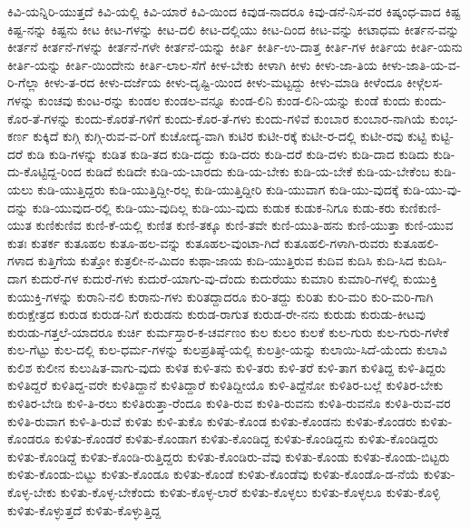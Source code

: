 {ಕಿವಿ-ಯನ್ನಿರಿ-ಯುತ್ತದೆ
ಕಿವಿ-ಯಲ್ಲಿ
ಕಿವಿ-ಯಾರೆ
ಕಿವಿ-ಯಿಂದ
ಕಿವುಡ-ನಾದರೂ
ಕಿವು-ಡನೆ-ನಿಸ-ವರ
ಕಿಷ್ಕಂಧ-ವಾದ
ಕಿಷ್ಟ
ಕಿಷ್ಟ-ನನ್ನು
ಕಿಷ್ಟನು
ಕೀಟ
ಕೀಟ-ಗಳನ್ನು
ಕೀಟ-ದಲಿ
ಕೀಟ-ದಲ್ಲಿಯು
ಕೀಟ-ದಿಂದ
ಕೀಟ-ವನ್ನು
ಕೀಟಾಧಮ
ಕೀರ್ತನ-ವನ್ನು
ಕೀರ್ತನೆ
ಕೀರ್ತನೆ-ಗಳನ್ನು
ಕೀರ್ತನೆ-ಗಳೇ
ಕೀರ್ತನೆ-ಯನ್ನು
ಕೀರ್ತಿ
ಕೀರ್ತಿ-ಉ-ದಾತ್ತ
ಕೀರ್ತಿ-ಗಳ
ಕೀರ್ತಿಯ
ಕೀರ್ತಿ-ಯನು
ಕೀರ್ತಿ-ಯನ್ನು
ಕೀರ್ತಿ-ಯಿಂದೇನು
ಕೀರ್ತಿ-ಲಾಲ-ಸೆಗೆ
ಕೀಳ-ಬೇಕು
ಕೀಳಾಗಿ
ಕೀಳು
ಕೀಳು-ಜಾ-ತಿಯ
ಕೀಳು-ಜಾತಿ-ಯ-ವ-ರಿ-ಗೆಲ್ಲಾ
ಕೀಳು-ತ-ರದ
ಕೀಳು-ದರ್ಜೆಯ
ಕೀಳು-ದೃಷ್ಟಿ-ಯಿಂದ
ಕೀಳು-ಮಟ್ಟದ್ದು
ಕೀಳು-ಮಾಡಿ
ಕೀಳೆಂದೂ
ಕೀಳ್ಗೆಲಸ-ಗಳನ್ನು
ಕುಂಚವು
ಕುಂಟ-ರನ್ನು
ಕುಂಡಲ
ಕುಂಡಲ-ವನ್ನೂ
ಕುಂಡ-ಲಿನಿ
ಕುಂಡ-ಲಿನಿ-ಯನ್ನು
ಕುಂಡೆ
ಕುಂದು
ಕುಂದು-ಕೊರ-ತೆ-ಗಳನ್ನು
ಕುಂದು-ಕೊರತೆ-ಗಳಿಗೆ
ಕುಂದು-ಕೊರ-ತೆ-ಗಳು
ಕುಂದು-ಗಳಿವೆ
ಕುಂಬಾರ
ಕುಂಬಾರ-ನಾಗಿಯೆ
ಕುಂಭ-ಕರ್ಣ
ಕುಕ್ಕಿದೆ
ಕುಗ್ಗಿ
ಕುಗ್ಗಿ-ರುವ-ವ-ರಿಗೆ
ಕುಚೋದ್ಯ-ವಾಗಿ
ಕುಟಿರ
ಕುಟೀ-ರಕ್ಕೆ
ಕುಟೀ-ರ-ದಲ್ಲಿ
ಕುಟೀ-ರವು
ಕುಟ್ಟಿ
ಕುಟ್ಟಿ-ದರೆ
ಕುಡಿ
ಕುಡಿ-ಗಳನ್ನು
ಕುಡಿತ
ಕುಡಿ-ತದ
ಕುಡಿ-ದದ್ದು
ಕುಡಿ-ದರು
ಕುಡಿ-ದರೆ
ಕುಡಿ-ದಳು
ಕುಡಿ-ದಾದ
ಕುಡಿದು
ಕುಡಿ-ದು-ಕೊಟ್ಟಿದ್ದ-ರಿಂದ
ಕುಡಿದೆ
ಕುಡಿದೇ
ಕುಡಿ-ಯ-ಬಾರದು
ಕುಡಿ-ಯ-ಬೇಕು
ಕುಡಿ-ಯ-ಬೇಕೆ
ಕುಡಿ-ಯ-ಬೇಕೆಂಬ
ಕುಡಿ-ಯಲು
ಕುಡಿ-ಯುತ್ತಿದ್ದರು
ಕುಡಿ-ಯುತ್ತಿದ್ದೀ-ರಲ್ಲ
ಕುಡಿ-ಯುತ್ತಿದ್ದೀರಿ
ಕುಡಿ-ಯುವಾಗ
ಕುಡಿ-ಯು-ವುದಕ್ಕೆ
ಕುಡಿ-ಯು-ವು-ದನ್ನು
ಕುಡಿ-ಯುವುದ-ರಲ್ಲಿ
ಕುಡಿ-ಯು-ವುದಿಲ್ಲ
ಕುಡಿ-ಯು-ವುದು
ಕುಡುಕ
ಕುಡುಕ-ನಿಗೂ
ಕುಡು-ಕರು
ಕುಣಿಕುಣಿ-ಯುತ
ಕುಣಿಕುಣಿವ
ಕುಣಿ-ಕೆ-ಯಲ್ಲಿ
ಕುಣಿತ
ಕುಣಿ-ತಕ್ಕೂ
ಕುಣಿ-ತವೇ
ಕುಣಿ-ಯುತಿ-ಹನು
ಕುಣಿ-ಯುತ್ತಾ
ಕುಣಿ-ಯುವ
ಕುತಃ
ಕುತರ್ಕ
ಕುತೂಹಲ
ಕುತೂ-ಹಲ-ವನ್ನು
ಕುತೂಹಲ-ವುಂಟಾ-ಗಿದೆ
ಕುತೂಹಲಿ-ಗಳಾಗಿ-ರುವರು
ಕುತೂಹಲಿ-ಗಳಾದ
ಕುತ್ತಿಗೆಯ
ಕುತ್ತೋ
ಕುತ್ರಲೀ-ನ-ಮಿದಂ
ಕುಥಾ-ಜಾಯ
ಕುದಿ-ಯುತ್ತಿರುವ
ಕುದಿವ
ಕುದಿಸಿ
ಕುದಿ-ಸಿದ
ಕುದಿಸಿ-ದಾಗ
ಕುದುರೆ-ಗಳ
ಕುದುರೆ-ಗಳು
ಕುದುರೆ-ಯಾಗು-ವು-ದೆಂದು
ಕುದುರೆಯು
ಕುಮಾರಿ
ಕುಮಾರಿ-ಗಳಲ್ಲಿ
ಕುಯುಕ್ತಿ
ಕುಯುಕ್ತಿ-ಗಳನ್ನು
ಕುರಾನಿ-ನಲಿ
ಕುರಾನು-ಗಳು
ಕುರಿತದ್ದಾದರೂ
ಕುರಿ-ತದ್ದು
ಕುರಿತು
ಕುರಿ-ಮರಿ
ಕುರಿ-ಮರಿ-ಗಾಗಿ
ಕುರುಕ್ಷೇತ್ರದ
ಕುರುಡ
ಕುರುಡ-ನಿಗೆ
ಕುರುಡನು
ಕುರುಡ-ರಾಗುತ
ಕುರುಡ-ರೇ-ನನು
ಕುರುಡು
ಕುರುಡು-ಕೀಟವು
ಕುರುಡು-ಗತ್ತಲೆ-ಯಾದರೂ
ಕುರ್ಚಿ
ಕುರ್ಮಸ್ತಾರ-ಕ-ಚರ್ವಣಂ
ಕುಲ
ಕುಲಂ
ಕುಲಕೆ
ಕುಲ-ಗುರು
ಕುಲ-ಗುರು-ಗಳೇಕೆ
ಕುಲ-ಗೆಟ್ಟು
ಕುಲ-ದಲ್ಲಿ
ಕುಲ-ಧರ್ಮ-ಗಳನ್ನು
ಕುಲಪ್ರತಿಷ್ಠೆ-ಯಲ್ಲಿ
ಕುಲತ್ರೀ-ಯನ್ನು
ಕುಲಾಯಿ-ಸಿದೆ-ಯೆಂದು
ಕುಲಾವಿ
ಕುಲಿಶ
ಕುಲೀನ
ಕುಲುಷಿತ-ವಾಗು-ವುದು
ಕುಳಿತ
ಕುಳಿ-ತನು
ಕುಳಿ-ತರು
ಕುಳಿ-ತರೆ
ಕುಳಿ-ತಾಗ
ಕುಳಿತಿದ್ದ
ಕುಳಿ-ತಿದ್ದರು
ಕುಳಿತಿದ್ದರೆ
ಕುಳಿತಿದ್ದ-ವರೇ
ಕುಳಿತಿದ್ದಾನೆ
ಕುಳಿತಿದ್ದಾರೆ
ಕುಳಿತಿದ್ದೀಯೊ
ಕುಳಿ-ತಿದ್ದೆನೋ
ಕುಳಿತಿರ-ಬಲ್ಲೆ
ಕುಳಿತಿರ-ಬೇಕು
ಕುಳಿತಿರ-ಬೇಡಿ
ಕುಳಿ-ತಿ-ರಲು
ಕುಳಿತಿರುತ್ತಾ-ರೆಂದೂ
ಕುಳಿತಿ-ರುವ
ಕುಳಿತಿ-ರುವನು
ಕುಳಿತಿ-ರುವನೊ
ಕುಳಿತಿ-ರುವ-ವರ
ಕುಳಿತಿ-ರುವಾಗ
ಕುಳಿ-ತಿ-ರುವೆ
ಕುಳಿತು
ಕುಳಿ-ತುಕೊ
ಕುಳಿತು-ಕೊಂಡ
ಕುಳಿತು-ಕೊಂಡನು
ಕುಳಿತು-ಕೊಂಡರು
ಕುಳಿತು-ಕೊಂಡರೂ
ಕುಳಿತು-ಕೊಂಡರೆ
ಕುಳಿತು-ಕೊಂಡಾಗ
ಕುಳಿತು-ಕೊಂಡಿದ್ದ
ಕುಳಿತು-ಕೊಂಡಿದ್ದನು
ಕುಳಿತು-ಕೊಂಡಿದ್ದರು
ಕುಳಿತು-ಕೊಂಡಿದ್ದೆ
ಕುಳಿತು-ಕೊಂಡಿ-ರುತ್ತಿದ್ದರು
ಕುಳಿತು-ಕೊಂಡಿರು-ವೆವು
ಕುಳಿತು-ಕೊಂಡು
ಕುಳಿತು-ಕೊಂಡು-ಬಿಟ್ಟರು
ಕುಳಿತು-ಕೊಂಡು-ಬಿಟ್ಟು
ಕುಳಿತು-ಕೊಂಡೂ
ಕುಳಿತು-ಕೊಂಡೆ
ಕುಳಿತು-ಕೊಂಡೆವು
ಕುಳಿತು-ಕೊಂಡೊ-ಡ-ನೆಯೆ
ಕುಳಿತು-ಕೊಳ್ಳ-ಬೇಕು
ಕುಳಿತು-ಕೊಳ್ಳ-ಬೇಕೆಂದು
ಕುಳಿತು-ಕೊಳ್ಳ-ಲಾರೆ
ಕುಳಿತು-ಕೊಳ್ಳಲು
ಕುಳಿತು-ಕೊಳ್ಳಲೂ
ಕುಳಿತು-ಕೊಳ್ಳಿ
ಕುಳಿತು-ಕೊಳ್ಳುತ್ತದೆ
ಕುಳಿತು-ಕೊಳ್ಳುತ್ತಿದ್ದ
}
